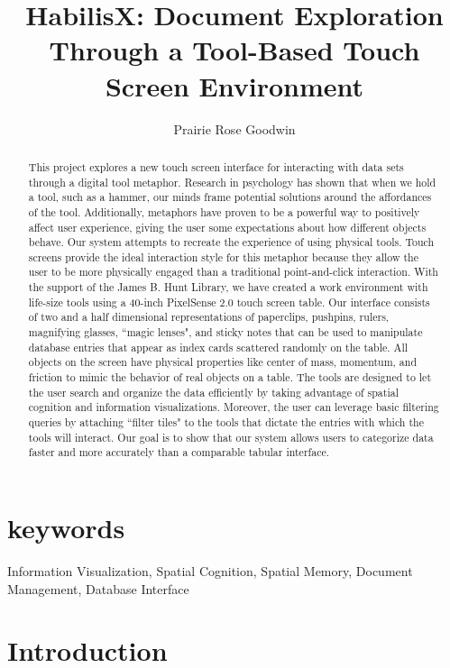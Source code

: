 \documentclass{article}
\begin{document}
\title{HabilisX: Document Exploration Through a Tool-Based Touch Screen Environment }
\author{Prairie Rose Goodwin}
\date{}
\maketitle
\begin{abstract}
This project explores a new touch screen interface for interacting with data sets through a digital tool metaphor.  Research in psychology has shown that when we hold a tool, such as a hammer, our minds frame potential solutions around the affordances of the tool.  Additionally, metaphors have proven to be a powerful way to positively affect user experience, giving the user some expectations about how different objects behave.  Our system attempts to recreate the experience of using physical tools. Touch screens provide the ideal interaction style for this metaphor because they allow the user to be more physically engaged than a traditional point-and-click interaction. With the support of the James B. Hunt Library, we have created a work environment with life-size tools using a 40-inch PixelSense 2.0 touch screen table.  Our interface consists of two and a half dimensional representations of paperclips, pushpins, rulers, magnifying glasses, ``magic lenses", and sticky notes that can be used to manipulate database entries that appear as index cards scattered randomly on the table.  All objects on the screen have physical properties like center of mass, momentum, and friction to mimic the behavior of real objects on a table.  The tools are designed to let the user search and organize the data efficiently by taking advantage of spatial cognition and information visualizations.  Moreover, the user can leverage basic filtering queries by attaching ``filter tiles" to the tools that dictate the entries with which the tools will interact.  Our goal is to show that our system allows users to categorize data faster and more accurately than a comparable tabular interface.
\end{abstract}
\section{keywords}
Information Visualization, Spatial Cognition, Spatial Memory, Document Management, Database Interface

\section{Introduction}	
\end{document}
